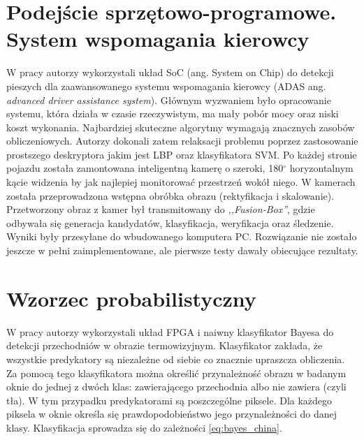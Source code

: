 
\section{Podejście sprzętowo-programowe. System wspomagania kierowcy}
W pracy \cite{piao2016real} autorzy wykorzystali układ SoC (ang. System on Chip) do detekcji pieszych dla zaawansowanego systemu wspomagania kierowcy (ADAS ang. \textit{advanced driver assistance system}). 
Głównym wyzwaniem było opracowanie systemu, która działa w czasie rzeczywistym, ma mały pobór mocy oraz niski koszt wykonania. 
Najbardziej skuteczne algorytmy wymagają znacznych zasobów obliczeniowych. %
Autorzy dokonali zatem relaksacji problemu poprzez zastosowanie prostszego deskryptora jakim jest LBP oraz klasyfikatora SVM. 
Po każdej stronie pojazdu została zamontowana inteligentną kamerę o szeroki, 180$^\circ$ horyzontalnym kącie widzenia by jak najlepiej monitorować przestrzeń wokół niego. 
W kamerach została przeprowadzona wstępna obróbka obrazu (rektyfikacja i skalowanie). 
Przetworzony obraz z kamer był transmitowany do \textit{,,Fusion-Box''}, gdzie odbywała się generacja kandydatów, klasyfikacja, weryfikacja oraz śledzenie. 
Wyniki były przesyłane do wbudowanego komputera PC. 
Rozwiązanie nie zostało jeszcze w pełni zaimplementowane, ale pierwsze testy dawały obiecujące rezultaty.

\section{Wzorzec probabilistyczny}
\label{sec:xiao_2015}
W pracy \cite{xiao_2015} autorzy wykorzystali układ FPGA i naiwny klasyfikator Bayesa do detekcji przechodniów w obrazie termowizyjnym. Klasyfikator zakłada, że wszystkie predykatory są niezależne od siebie co znacznie upraszcza obliczenia. Za pomocą tego klasyfikatora można określić przynależność obrazu w badanym oknie do jednej z dwóch klas: zawierającego przechodnia albo nie zawiera (czyli tła). W tym przypadku predykatorami są poszczególne piksele. Dla każdego piksela w oknie określa się prawdopodobieństwo jego przynależności do danej klasy. Klasyfikacja sprowadza się do zależności \eqref{eq:bayes_china}.

